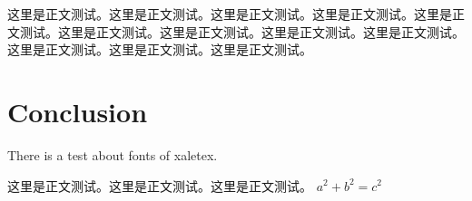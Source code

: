 \documentclass[12pt,a4paper]{article} %
\begin{document}
{\hei 这里是正文测试。这里是正文测试。这里是正文测试。这里是正文测试。这里是正文测试。}这里是正文测试。这里是正文测试。这里是正文测试。这里是正文测试。这里是正文测试。这里是正文测试。这里是正文测试。


\section{Conclusion} %

There is a test about fonts of xaletex.

这里是正文测试。这里是正文测试。这里是正文测试。
$a^2+b^2=c^2$





\end{document}
